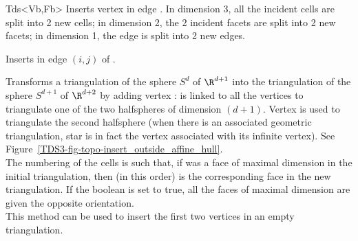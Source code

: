 \begin{ccClassTemplate}{Tds<Vb,Fb>}
{Inserts vertex  in edge . In dimension 3, all the
incident cells are split into 2 new cells; in dimension 2, the 2
incident facets are split into 2 new facets; in dimension 1, the edge is 
split into 2 new edges.
} 

{Inserts  in edge $(i,j)$ of .
}

{Transforms a triangulation of the sphere $S^d$ of $\R^{d+1}$ into the
triangulation of the sphere $S^{d+1}$ of $\R^{d+2}$ by adding vertex :  
 is linked to all the vertices to triangulate one of the two
halfspheres of dimension $(d+1)$. Vertex  is used to
triangulate the second halfsphere (when there is an associated
geometric triangulation, star is in fact the vertex associated with
its infinite vertex). See
Figure~\ref{TDS3-fig-topo-insert_outside_affine_hull}.\\  
The numbering of the cells is such that, if  was a face of
maximal dimension in the initial triangulation, then  (in
this order) is the corresponding face in the new triangulation. If the
boolean  is set to true, all the faces of maximal
dimension are given the opposite orientation.\\
This method can be used to insert the first two vertices in an empty
triangulation.
} 

\begin{ccTexOnly}
\begin{figure}[htbp]


\end{figure}
\end{ccTexOnly}
\end{ccClassTemplate}
